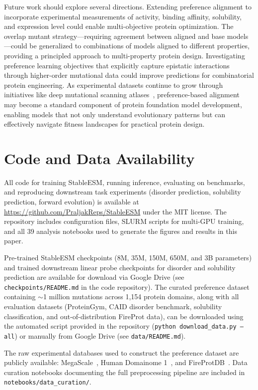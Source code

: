 \documentclass[]{fairmeta}
\begin{document}
Future work should explore several directions.
Extending preference alignment to incorporate experimental measurements of activity, binding affinity, solubility, and expression level could enable multi-objective protein optimization.
The overlap mutant strategy—requiring agreement between aligned and base models—could be generalized to combinations of models aligned to different properties, providing a principled approach to multi-property protein design.
Investigating preference learning objectives that explicitly capture epistatic interactions through higher-order mutational data could improve predictions for combinatorial protein engineering.
As experimental datasets continue to grow through initiatives like deep mutational scanning atlases~\citep{fowler2023atlas}, preference-based alignment may become a standard component of protein foundation model development, enabling models that not only understand evolutionary patterns but can effectively navigate fitness landscapes for practical protein design.

\section{Code and Data Availability}
\label{sec:code_data}

All code for training StableESM, running inference, evaluating on benchmarks, and reproducing downstream task experiments (disorder prediction, solubility prediction, forward evolution) is available at \url{https://github.com/PraljakReps/StableESM} under the MIT license.
The repository includes configuration files, SLURM scripts for multi-GPU training, and all 39 analysis notebooks used to generate the figures and results in this paper.

Pre-trained StableESM checkpoints (8M, 35M, 150M, 650M, and 3B parameters) and trained downstream linear probe checkpoints for disorder and solubility prediction are available for download via Google Drive (see \texttt{checkpoints/README.md} in the code repository).
The curated preference dataset containing $\sim$1 million mutations across 1,154 protein domains, along with all evaluation datasets (ProteinGym, CAID disorder benchmark, solubility classification, and out-of-distribution FireProt data), can be downloaded using the automated script provided in the repository (\texttt{python download\_data.py --all}) or manually from Google Drive (see \texttt{data/README.md}).

The raw experimental databases used to construct the preference dataset are publicly available: MegaScale~\citep{tsuboyama2023mega}, Human Domainome 1~\citep{beltran2025site}, and FireProtDB~\citep{stourac2021fireprotdb}.
Data curation notebooks documenting the full preprocessing pipeline are included in \texttt{notebooks/data\_curation/}.
\end{document}
